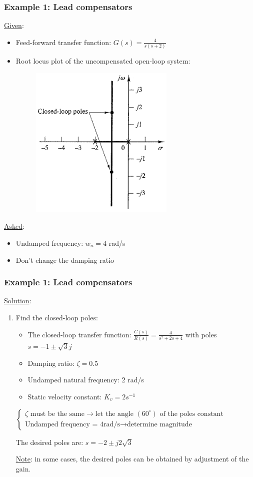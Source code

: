 \begin{frame}
	\frametitle{Example 1: Lead compensators}
	\underline{Given}:
	\begin{itemize}
		\item Feed-forward transfer function: $G(s)=\frac{4}{s(s+2)}$
		\item Root locus plot of the uncompensated open-loop system:
		\begin{figure}
			\centering
			\includegraphics[width=0.3\linewidth]{Ex1_rootlocus}
		\end{figure}
	\end{itemize}
	\underline{Asked}:
	\begin{itemize}
		\item Undamped frequency: $w_n=4$ rad/s
		\item Don't change the damping ratio
	\end{itemize}
\end{frame}

\begin{frame}
	\frametitle{Example 1: Lead compensators}
	\underline{Solution}:
	\begin{enumerate}
		\item Find the closed-loop poles: 
		\begin{itemize}
			\item The closed-loop transfer function: $\frac{C(s)}{R(s)}=\frac{4}{s^2+2s+4}$ with poles $s=-1\pm\sqrt{3}j$
			\item Damping ratio: $\zeta=0.5$
			\item Undamped natural frequency: 2 rad/s
			\item Static velocity constant: $K_v=2s^{-1}$
		\end{itemize}
		\vspace{3mm}
		$\begin{cases}
			\zeta \text{ must be the same} \rightarrow \text{let the angle } (60^{\circ}) \text{ of the poles constant}\\
			\text{Undamped frequency = 4rad/s} \rightarrow \text{determine magnitude}
		\end{cases}$
		\vspace{1mm}
		
		The desired poles are: $s=-2\pm j2\sqrt{3}$
		\vspace{3mm}
		
		\underline{Note}: in some cases, the desired poles can be obtained by adjustment of the gain. 
	\end{enumerate}
\end{frame}

